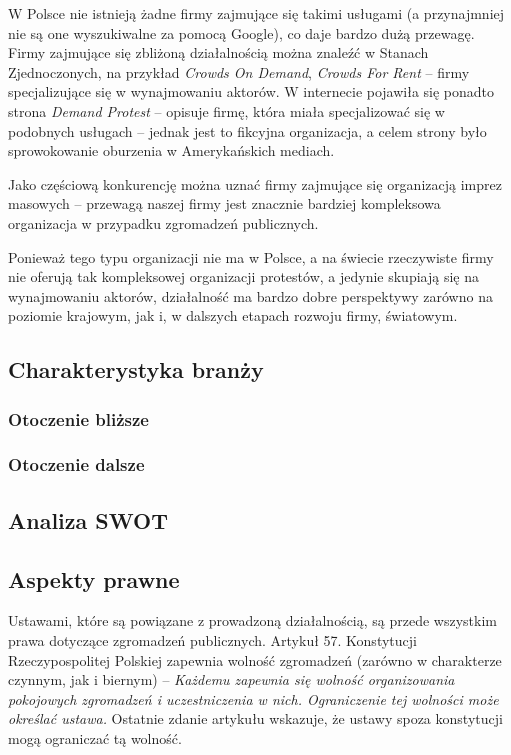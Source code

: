 \documentclass{article}
\begin{document}
W Polsce nie istnieją żadne firmy zajmujące się takimi usługami (a przynajmniej nie są one wyszukiwalne za pomocą Google), co daje bardzo dużą przewagę. Firmy zajmujące się zbliżoną działalnością można znaleźć w Stanach Zjednoczonych, na przykład \textit{Crowds On Demand}, \textit{Crowds For Rent} -- firmy specjalizujące się w wynajmowaniu aktorów. W internecie pojawiła się ponadto strona \textit{Demand Protest} -- opisuje firmę, która miała specjalizować się w podobnych usługach -- jednak jest to fikcyjna organizacja, a celem strony było sprowokowanie oburzenia w Amerykańskich mediach. 

Jako częściową konkurencję można uznać firmy zajmujące się organizacją imprez masowych -- przewagą naszej firmy jest znacznie bardziej kompleksowa organizacja w przypadku zgromadzeń publicznych.

Ponieważ tego typu organizacji nie ma w Polsce, a na świecie rzeczywiste firmy nie oferują tak kompleksowej organizacji protestów, a jedynie skupiają się na wynajmowaniu aktorów, działalność ma bardzo dobre perspektywy zarówno na poziomie krajowym, jak i, w dalszych etapach rozwoju firmy, światowym. 

\subsection{Charakterystyka branży}
\subsubsection{Otoczenie bliższe} %
\subsubsection{Otoczenie dalsze} %
\subsection{Analiza SWOT}
\subsection{Aspekty prawne}
Ustawami, które są powiązane z prowadzoną działalnością, są przede wszystkim prawa dotyczące zgromadzeń publicznych. Artykuł 57. Konstytucji Rzeczypospolitej Polskiej zapewnia wolność zgromadzeń (zarówno w charakterze czynnym, jak i biernym) -- \textit{Każdemu zapewnia się wolność organizowania pokojowych zgromadzeń i uczestniczenia w nich. Ograniczenie tej wolności może określać ustawa.} Ostatnie zdanie artykułu wskazuje, że ustawy spoza konstytucji mogą ograniczać tą wolność. 
\end{document}
